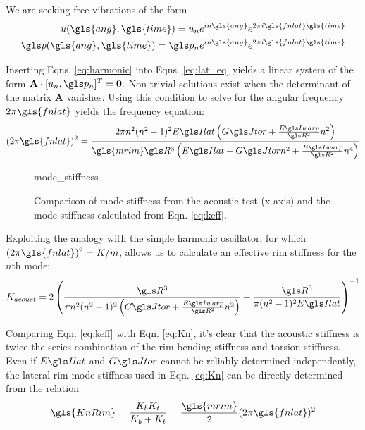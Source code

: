 \documentclass[../thesis.tex]{subfiles}
\begin{document}
We are seeking free vibrations of the form
\begin{subequations}\label{eq:harmonic}
\begin{align}
u(\gls{ang}, \gls{time})=u_n e^{in\gls{ang}}e^{2\pi i \gls{fnlat} \gls{time}}\\
\p(\gls{ang}, \gls{time})=\p_n e^{in\gls{ang}}e^{2\pi i \gls{fnlat} \gls{time}}
\end{align}
\end{subequations}

Inserting Eqns. \eqref{eq:harmonic} into Eqns. \eqref{eq:lat_eq} yields a linear system of the form $\mathbf{A}\cdot [u_n, \p_n]^T=\mathbf{0}$. Non-trivial solutions exist when the determinant of the matrix $\mathbf{A}$ vanishes. Using this condition to solve for the angular frequency $2\pi \gls{fnlat}$ yields the frequency equation:
\begin{equation}\label{eq:lat_freq_eq}
(2\pi \gls{fnlat})^2 = \frac{2\pi n^2(n^2-1)^2\EIl\left(\GJ + \frac{\EIw}{\R^2}n^2 \right)}
                {\gls{mrim} \R^3 \left( \EIl + \GJ n^2 + \frac{\EIw}{\R^2}n^4\right)}
\end{equation}

\begin{figure}
{mode_stiffness}
\caption[Acoustic mode stiffnesses of rims]{Comparison of mode stiffness from the acoustic test (x-axis) and the mode stiffness calculated from Eqn. \eqref{eq:keff}.}
\label{fig:keff}
\end{figure}

Exploiting the analogy with the simple harmonic oscillator, for which $(2\pi \gls{fnlat})^2=K/m$, allows us to calculate an effective rim stiffness for the $n$th mode:
\begin{equation}\label{eq:keff}
K_{acoust} = 2 \left( \frac{\R^3}{\pi n^2(n^2-1)^2\left( \GJ + \frac{\EIw}{\R^2}n^2\right)} +
  \frac{\R^3}{\pi(n^2-1)^2\EIl} \right)^{-1}
\end{equation}

Comparing Eqn. \eqref{eq:keff} with Eqn. \eqref{eq:Kn}, it's clear that the acoustic stiffness is twice the series combination of the rim bending stiffness and torsion stiffness. Even if $\EIl$ and $\GJ$ cannot be reliably determined independently, the lateral rim mode stiffness used in Eqn. \eqref{eq:Kn} can be directly determined from the relation
\begin{equation}
\gls{KnRim} = \frac{\Kbend\Ktors}{\Kbend + \Ktors} = \frac{\gls{mrim}}{2}(2\pi\gls{fnlat})^2
\end{equation}
\end{document}
